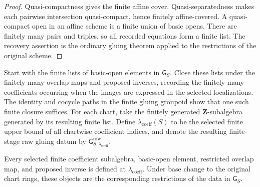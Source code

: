 \begin{proof}
  Quasi-compactness gives the finite affine cover.  Quasi-separatedness makes
  each pairwise intersection quasi-compact, hence finitely affine-covered.
  A quasi-compact open in an affine scheme is a finite union of basic opens.
  There are finitely many pairs and triples, so all recorded equations form a
  finite list.  The recovery assertion is the ordinary gluing theorem applied
  to the restrictions of the original scheme.
\end{proof}

\begin{definition}
  \label{def:nagata-affine-gluing-coefficient-stage}

  Start with the finite lists of basic-open elements in $\mathsf G_S$.
  Close these lists under the finitely many overlap maps and proposed
  inverses, recording the finitely many coefficients occurring when the
  images are expressed in the selected localizations.  The identity and
  cocycle paths in the finite gluing groupoid show that one such finite
  closure suffices.  For each chart, take the finitely generated
  $\mathbf Z$-subalgebra generated by its resulting finite list.  Define
  $\lambda_{\mathrm{coeff}}(S)$ to be the selected finite upper bound of all
  chartwise coefficient indices, and denote the resulting finite-stage raw
  gluing datum by
  $\mathsf G_{S,\lambda_{\mathrm{coeff}}}^{\mathrm{raw}}$.
\end{definition}

\begin{lemma}
  \label{lemma:nagata-affine-gluing-coefficients-descend}

  Every selected finite coefficient subalgebra, basic-open element, restricted
  overlap map, and proposed inverse is defined at
  $\lambda_{\mathrm{coeff}}$.  Under base change to the original chart rings,
  these objects are the corresponding restrictions of the data in
  $\mathsf G_S$.
\end{lemma}

